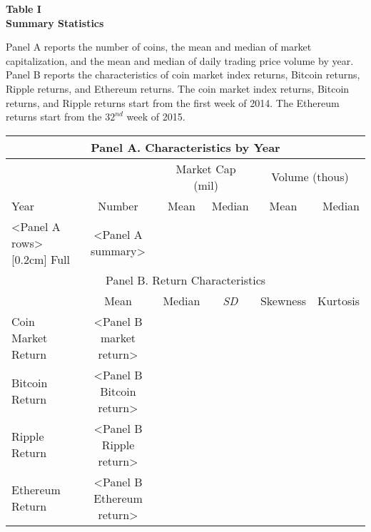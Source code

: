 \documentclass{article}
\begin{document}
    \begin{center}
        \textbf{
        Table I
        \\
        Summary Statistics
        }
        \begin{justify}
            \footnotesize{
            Panel A reports the number of coins, the mean and median of market capitalization, and the mean and median of daily trading price volume by year. Panel B reports the characteristics of coin market index returns, Bitcoin returns, Ripple returns, and Ethereum returns. The coin market index returns, Bitcoin returns, and Ripple returns start from the first week of 2014. The Ethereum returns start from the $32^{nd}$ week of 2015.
            }
        \end{justify}
        \-
        \begin{tabular}{lccccr}
            \toprule
            \multicolumn{6}{c}{Panel A. Characteristics by Year} \\
            \midrule
            \multicolumn{2}{c}{} & 
            \multicolumn{2}{c}{Market Cap (mil)} &
            \multicolumn{2}{c}{Volume (thous)}
            \\
            \cmidrule(lr){3-4} \cmidrule(lr){5-6} 
            Year & Number & Mean & Median & Mean & Median
            \\
            \midrule
            <Panel A rows>
            [0.2cm]
            Full & <Panel A summary>
            \\
            \midrule
            \multicolumn{6}{c}{Panel B. Return Characteristics} \\
            \midrule
            {} & Mean & Median & \textit{SD} & Skewness & Kurtosis
            \\
            \midrule
            Coin Market Return & <Panel B market return>
            \\
            Bitcoin Return & <Panel B Bitcoin return>
            \\
            Ripple Return & <Panel B Ripple return>
            \\
            Ethereum Return & <Panel B Ethereum return>
            \\
            \bottomrule
        \end{tabular}
    \end{center}
\end{document}
